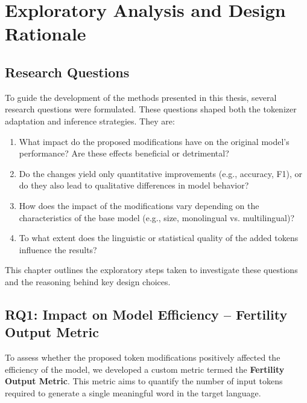
\chapter{Exploratory Analysis and Design Rationale}


\label{chap:exploration}

\section{Research Questions}
\label{sec:research_questions}

To guide the development of the methods presented in this thesis, several research questions were formulated. These questions shaped both the tokenizer adaptation and inference strategies. They are:

\begin{enumerate}
    \item What impact do the proposed modifications have on the original model's performance? Are these effects beneficial or detrimental?
    \item Do the changes yield only quantitative improvements (e.g., accuracy, F1), or do they also lead to qualitative differences in model behavior?
    \item How does the impact of the modifications vary depending on the characteristics of the base model (e.g., size, monolingual vs. multilingual)?
    \item To what extent does the linguistic or statistical quality of the added tokens influence the results?
\end{enumerate}

This chapter outlines the exploratory steps taken to investigate these questions and the reasoning behind key design choices.

\section{RQ1: Impact on Model Efficiency – Fertility Output Metric}
\label{sec:fertility_metric}

To assess whether the proposed token modifications positively affected the efficiency of the model, we developed a custom metric termed the \textbf{Fertility Output Metric}. This metric aims to quantify the number of input tokens required to generate a single meaningful word in the target language.

